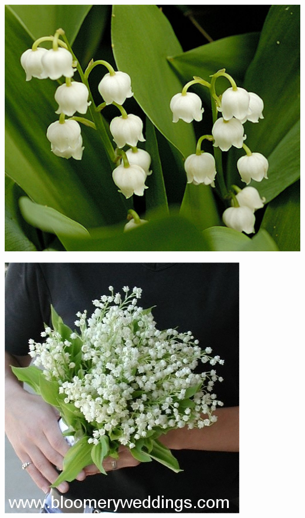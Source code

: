 \documentclass{article}
\begin{document}
\begin{center}
\includegraphics[width=0.9\textheight, angle=90]{../Lily-of-the-Valley.jpg}
\end{center}
\newpage

\begin{center}
\includegraphics[width=0.9\textheight, angle=90]{../Lily-of-the-Valley_Bouquet.jpg}
\end{center}
\newpage
\end{document}
